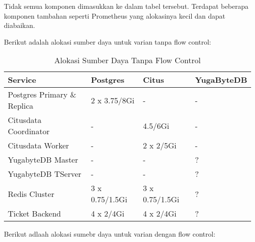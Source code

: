 Tidak semua komponen dimasukkan ke dalam tabel tersebut. Terdapat beberapa komponen tambahan seperti Prometheus yang alokasinya kecil dan dapat diabaikan.

Berikut adalah alokasi sumber daya untuk varian tanpa flow control:

\begin{table}[htbp]
    \centering
    \caption{Alokasi Sumber Daya Tanpa Flow Control}
    \label{tab:nofc-allocation}
    \begin{tabular}{|l|l|l|l|}
        \hline
        \textbf{Service}            & \textbf{Postgres} & \textbf{Citus} & \textbf{YugaByteDB} \\ \hline
        Postgres Primary \& Replica & 2 x 3.75/8Gi      & -              & -                   \\ \hline
        Citusdata Coordinator       & -                 & 4.5/6Gi        & -                   \\ \hline
        Citusdata Worker            & -                 & 2 x 2/5Gi      & -                   \\ \hline
        YugabyteDB Master           & -                 & -              & ?                   \\ \hline
        YugabyteDB TServer          & -                 & -              & ?                   \\ \hline
        Redis Cluster               & 3 x 0.75/1.5Gi    & 3 x 0.75/1.5Gi & ?                   \\ \hline
        Ticket Backend              & 4 x 2/4Gi         & 4 x 2/4Gi      & ?                   \\ \hline
    \end{tabular}
\end{table}

Berikut adlaah alokasi sumebr daya untuk varian dengan flow control:

